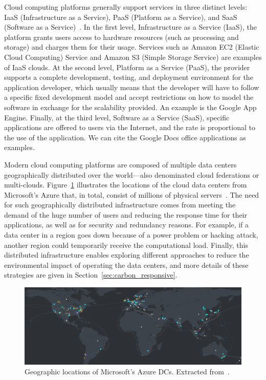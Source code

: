 Cloud computing platforms generally support services in three distinct levels: IaaS (Infrastructure as a Service), PaaS (Platform as a Service), and SaaS (Software as a Service)~\citep{fos08}. In the first level, Infrastructure as a Service (IaaS), the platform grants users access to hardware resources (such as processing and storage) and charges them for their usage. Services such as Amazon EC2 (Elastic Cloud Computing) Service and Amazon S3 (Simple Storage Service) are examples of IaaS clouds.   At the second level, Platform as a Service (PaaS), the provider supports a complete development, testing, and deployment environment for the application developer, which usually means that the developer will have to follow a specific fixed development model and accept restrictions on how to model the software in exchange for the scalability provided. An example is the Google App Engine. Finally, at the third level, Software as a Service (SaaS), specific applications are offered to users via the Internet, and the rate is proportional to the use of the application. We can cite the  Google Docs office applications as examples.


Modern cloud computing platforms are composed of multiple data centers geographically distributed over the world---also denominated cloud federations or multi-clouds. Figure~\ref{fig:dc_locations} illustrates the locations of the cloud data centers from Microsoft's Azure that, in total, consist of millions of physical servers~\cite{roach2021_microsoftazure}. The need for such geographically distributed infrastructure comes from meeting the demand of the huge number of users and reducing the response time for their applications, as well as for security and redundancy reasons. For example, if a data center in a region goes down because of a power problem or hacking attack, another region could temporarily receive the computational load. Finally, this distributed infrastructure enables exploring different approaches to reduce the environmental impact of operating the data centers, and more details of these strategies are given in Section~\ref{sec:carbon_responsive}.


\begin{figure}[h]
\centering
  \includegraphics[width=\linewidth]{images/azure_cloud_infra.png}
  \caption{Geographic locations of Microsoft's Azure DCs. Extracted from~\cite{azure_dcs_location}.}
  \label{fig:dc_locations}
\end{figure}

